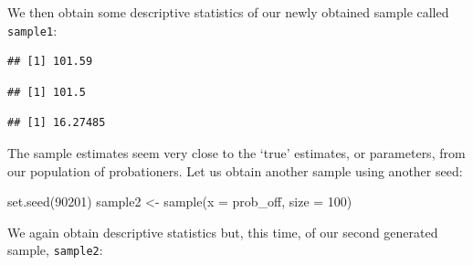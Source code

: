\documentclass[
]{book}
\newenvironment{Shaded}{\begin{snugshade}}{\end{snugshade}}
\newcommand{\AttributeTok}[1]{\textcolor[rgb]{0.77,0.63,0.00}{#1}}
\newcommand{\CommentTok}[1]{\textcolor[rgb]{0.56,0.35,0.01}{\textit{#1}}}
\newcommand{\DecValTok}[1]{\textcolor[rgb]{0.00,0.00,0.81}{#1}}
\newcommand{\FunctionTok}[1]{\textcolor[rgb]{0.00,0.00,0.00}{#1}}
\newcommand{\NormalTok}[1]{#1}
\newcommand{\OtherTok}[1]{\textcolor[rgb]{0.56,0.35,0.01}{#1}}
\newcommand{\SpecialCharTok}[1]{\textcolor[rgb]{0.00,0.00,0.00}{#1}}
\begin{document}
We then obtain some descriptive statistics of our newly obtained sample called \texttt{sample1}:

\begin{Shaded}
\end{Shaded}

\begin{verbatim}
## [1] 101.59
\end{verbatim}

\begin{Shaded}
\end{Shaded}

\begin{verbatim}
## [1] 101.5
\end{verbatim}

\begin{Shaded}
\end{Shaded}

\begin{verbatim}
## [1] 16.27485
\end{verbatim}

The sample estimates seem very close to the `true' estimates, or parameters, from our population of probationers. Let us obtain another sample using another seed:

\begin{Shaded}
\begin{Highlighting}[]
\FunctionTok{set.seed}\NormalTok{(}\DecValTok{90201}\NormalTok{)}
\NormalTok{sample2 }\OtherTok{\textless{}{-}} \FunctionTok{sample}\NormalTok{(}\AttributeTok{x =}\NormalTok{ prob\_off, }\AttributeTok{size =} \DecValTok{100}\NormalTok{)}
\end{Highlighting}
\end{Shaded}

We again obtain descriptive statistics but, this time, of our second generated sample, \texttt{sample2}:
\end{document}
